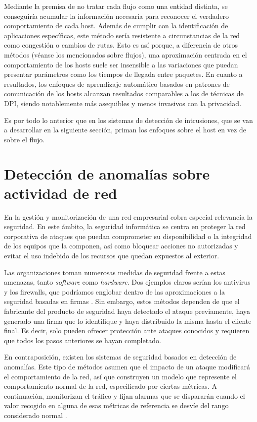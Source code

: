 Mediante la premisa de no tratar cada flujo como una entidad distinta, se conseguiría acumular la información necesaria para reconocer el verdadero comportamiento de cada host.
Además de cumplir con la identificación de aplicaciones específicas, este método sería resistente a circunstancias de la red como congestión o cambios de rutas.
Esto es así porque, a diferencia de otros métodos (véanse los mencionados sobre flujos), una aproximación centrada en el comportamiento de los hosts suele ser insensible a las variaciones que puedan presentar parámetros como los tiempos de llegada entre paquetes.
En cuanto a resultados, los enfoques de aprendizaje automático basados en patrones de comunicación de los hosts alcanzan resultados comparables a los de técnicas de DPI, siendo notablemente más asequibles y menos invasivos con la privacidad.

Es por todo lo anterior que en los sistemas de detección de intrusiones, que se van a desarrollar en la siguiente sección, priman los enfoques sobre el host en vez de sobre el flujo.

\section{Detección de anomalías sobre actividad de red}\label{detectanomsobreactividadred}

En la gestión y monitorización de una red empresarial cobra especial relevancia la seguridad.
En este ámbito, la seguridad informática se centra en proteger la red corporativa de ataques que puedan comprometer su disponibilidad o la integridad de los equipos que la componen, así como
bloquear acciones no autorizadas y evitar el uso indebido de los recursos que quedan expuestos al exterior.

Las organizaciones toman numerosas medidas de seguridad frente a estas amenazas, tanto \emph{software} como \emph{hardware}.
Dos ejemplos claros serían los antivirus y los firewalls, que podríamos englobar dentro de las aproximaciones a la seguridad basadas en firmas \cite{Alconzo_2019}.
Sin embargo, estos métodos dependen de que el fabricante del producto de seguridad haya detectado el ataque previamente, haya generado una firma que lo identifique y haya distribuido la misma hasta el cliente final.
Es decir, solo pueden ofrecer protección ante ataques conocidos y requieren que todos los pasos anteriores se hayan completado.

En contraposición, existen los sistemas de seguridad basados en detección de anomalías.
Este tipo de métodos asumen que el impacto de un ataque modificará el comportamiento de la red, así que construyen un modelo que represente el comportamiento normal de la red, especificado por ciertas métricas.
A continuación, monitorizan el tráfico y fijan alarmas que se dispararán cuando el valor recogido en alguna de esas métricas de referencia se desvíe del rango considerado normal \cite{Boutaba_2018}.

